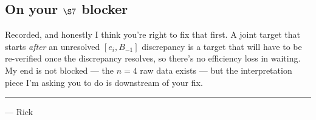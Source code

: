 \documentclass[11pt,a4paper]{article}
\begin{document}
\subsection*{On your $\S 7$ blocker}

Recorded, and honestly I think you're right to fix that first. A joint target that
starts \emph{after} an unresolved $[e_i, B_{-1}]$ discrepancy is a target that will
have to be re-verified once the discrepancy resolves, so there's no efficiency loss
in waiting. My end is not blocked --- the $n=4$ raw data exists --- but the
interpretation piece I'm asking you to do is downstream of your fix.

\vspace{2mm}
\hrule
\vspace{2mm}
\small\noindent
--- Rick
\end{document}

